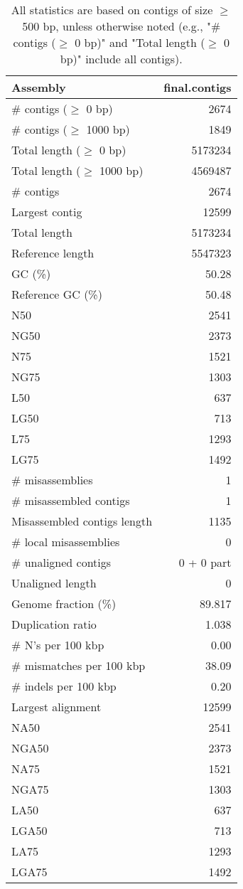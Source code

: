 \documentclass[12pt,a4paper]{article}
\begin{document}
\begin{table}[ht]
\begin{center}
\caption{All statistics are based on contigs of size $\geq$ 500 bp, unless otherwise noted (e.g., "\# contigs ($\geq$ 0 bp)" and "Total length ($\geq$ 0 bp)" include all contigs).}
\begin{tabular}{|l*{1}{|r}|}
\hline
Assembly & final.contigs \\ \hline
\# contigs ($\geq$ 0 bp) & 2674 \\ \hline
\# contigs ($\geq$ 1000 bp) & 1849 \\ \hline
Total length ($\geq$ 0 bp) & 5173234 \\ \hline
Total length ($\geq$ 1000 bp) & 4569487 \\ \hline
\# contigs & 2674 \\ \hline
Largest contig & 12599 \\ \hline
Total length & 5173234 \\ \hline
Reference length & 5547323 \\ \hline
GC (\%) & 50.28 \\ \hline
Reference GC (\%) & 50.48 \\ \hline
N50 & 2541 \\ \hline
NG50 & 2373 \\ \hline
N75 & 1521 \\ \hline
NG75 & 1303 \\ \hline
L50 & 637 \\ \hline
LG50 & 713 \\ \hline
L75 & 1293 \\ \hline
LG75 & 1492 \\ \hline
\# misassemblies & 1 \\ \hline
\# misassembled contigs & 1 \\ \hline
Misassembled contigs length & 1135 \\ \hline
\# local misassemblies & 0 \\ \hline
\# unaligned contigs & 0 + 0 part \\ \hline
Unaligned length & 0 \\ \hline
Genome fraction (\%) & 89.817 \\ \hline
Duplication ratio & 1.038 \\ \hline
\# N's per 100 kbp & 0.00 \\ \hline
\# mismatches per 100 kbp & 38.09 \\ \hline
\# indels per 100 kbp & 0.20 \\ \hline
Largest alignment & 12599 \\ \hline
NA50 & 2541 \\ \hline
NGA50 & 2373 \\ \hline
NA75 & 1521 \\ \hline
NGA75 & 1303 \\ \hline
LA50 & 637 \\ \hline
LGA50 & 713 \\ \hline
LA75 & 1293 \\ \hline
LGA75 & 1492 \\ \hline
\end{tabular}
\end{center}
\end{table}
\end{document}
